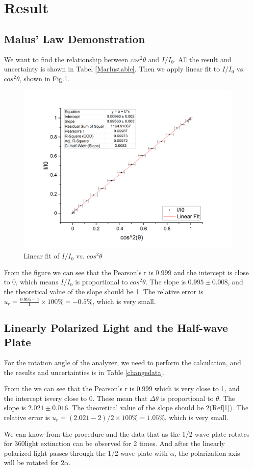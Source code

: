 \documentclass[12pt,a4paper]{article}
\begin{document}
\section{Result}
\subsection{Malus' Law Demonstration}
We want to find the relationship between $cos^2\theta$ and $I/I_0$. All the result and uncertainty is shown in Tabel \ref{Marlustable}. Then we apply linear fit to $I/I_0$ vs. $cos^2\theta$, shown in Fig.\ref{malusfigure}.
\begin{figure}[H]
    \centering
    \includegraphics[width=12cm]{malus.png}
    \caption{Linear fit of $I/I_0$ vs. $cos^2\theta$}
    \label{malusfigure}
\end{figure}
From the figure we can see that the Pearson’s r is 0.999 and the intercept is close to 0, which means $I/I_0$ is proportional to $cos^2\theta$. The slope is $0.995\pm0.008$, and the theoretical value of the slope should be 1. The relative error is $u_r=\frac{0.995-1}{1}\times 100\%=-0.5\%$, which is very small.

\subsection{Linearly Polarized Light and the Half-wave Plate}
For the rotation angle of the analyzer, we need to perform the calculation, and the results and uncertainties is in Table \ref{changedata}.\par 
From the  we can see that the Pearson’s r is 0.999 which is very close to 1, and the intercept isvery close to 0. These mean that $\Delta\theta$ is proportional to $\theta$. The slope is $2.021\pm0.016$. The theoretical value of the slope should be 2(Ref[1]). The relative error is $u_r=(2.021-2)/2\times 100\%=1.05\%$, which is very small.\par
We can know from the procedure and the data that as the 1/2-wave plate rotates for 360\degree light extinction can be observed for 2 times. And after the linearly polarized light passes through the 1/2-wave plate with $\alpha$, the polarization axis will be rotated for $2\alpha$.
\end{document}
